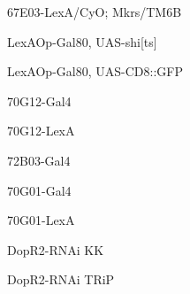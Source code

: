 \documentclass[17pt]{extarticle}
\begin{document}
\footnotesize
\newpage\vspace*{-0.15cm}
\begin{footnotesize}
67E03-LexA/CyO; Mkrs/TM6B \\[0.5em]
\end{footnotesize}
\footnotesize
\newpage\vspace*{-0.15cm}
\begin{footnotesize}
LexAOp-Gal80, UAS-shi[ts] \\[0.5em]
\end{footnotesize}
\footnotesize
\newpage\vspace*{-0.15cm}
\begin{footnotesize}
LexAOp-Gal80, UAS-CD8::GFP \\[0.5em]
\end{footnotesize}
\footnotesize
\newpage\vspace*{-0.15cm}
\begin{large}
70G12-Gal4 \\[0.5em]
\end{large}
\footnotesize
\newpage\vspace*{-0.15cm}
\begin{large}
70G12-LexA \\[0.5em]
\end{large}
\footnotesize
\newpage\vspace*{-0.15cm}
\begin{large}
72B03-Gal4 \\[0.5em]
\end{large}
\footnotesize
\newpage\vspace*{-0.15cm}
\begin{large}
70G01-Gal4 \\[0.5em]
\end{large}
\footnotesize
\newpage\vspace*{-0.15cm}
\begin{large}
70G01-LexA \\[0.5em]
\end{large}
\footnotesize
\newpage\vspace*{-0.15cm}
\begin{normalsize}
DopR2-RNAi KK \\[0.5em]
\end{normalsize}
\footnotesize
\newpage\vspace*{-0.15cm}
\begin{normalsize}
DopR2-RNAi TRiP \\[0.5em]
\end{normalsize}
\footnotesize
\end{document}
